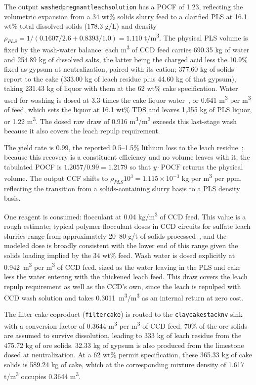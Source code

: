 \documentclass{article}
\renewcommand\_{\textunderscore\allowbreak}
\begin{document}
The output \texttt{washed\_pregnant\_leach\_solution} has a POCF of 1.23, reflecting the volumetric expansion from a 34 wt\% solids slurry feed to a clarified PLS at 16.1 wt\% total dissolved solids (178.3 g/L) and density $\rho_{PLS}=1/(0.1607/2.6+0.8393/1.0)=1.110$ \si{t/m^3}. The physical PLS volume is fixed by the wash-water balance: each \si{m^3} of CCD feed carries 690.35 kg of water and 254.89 kg of dissolved salts, the latter being the charged acid less the 10.9\% fixed as gypsum at neutralization, paired with its cation; 377.60 kg of solids report to the cake (333.00 kg of leach residue plus 44.60 kg of that gypsum), taking 231.43 kg of liquor with them at the 62 wt\% cake specification. Water used for washing is dosed at 3.3 times the cake liquor water~\citet{steinCalculateCountercurrentWashing1990}, or 0.641 \si{m^3} per \si{m^3} of feed, which sets the liquor at 16.1 wt\% TDS and leaves 1,355 kg of PLS liquor, or 1.22 \si{m^3}. The dosed raw draw of 0.916 \si{m^3/m^3} exceeds this last-stage wash because it also covers
the leach repulp requirement.

The yield rate is 0.99, the reported 0.5--1.5\% lithium loss to the leach residue~\cite{sgscanadaincSK1300Technical2024}; because this recovery is a constituent efficiency and no volume leaves with it, the tabulated POCF is $1.2057/0.99=1.2179$ so that $y \cdot \text{POCF}$ returns the physical volume. The output CCF shifts to $\rho_{PLS}10^3=1.115 \times 10^{-3}$ kg per \si{m^3} per ppm, reflecting the transition from a solids-containing slurry basis to a PLS density basis.

One reagent is consumed: flocculant at 0.04 \si{kg/m^3} of CCD feed. This value is a rough estimate; typical polymer flocculant doses in CCD circuits for sulfate leach slurries range from approximately 20--80 g/t of solids processed~\cite{sgscanadaincSK1300Technical2024}, and the modeled dose is broadly consistent with the lower end of this range given the solids loading implied by the 34 wt\% feed. Wash water is dosed explicitly at 0.942~\si{m^3} per \si{m^3} of CCD feed, sized as the water leaving in the PLS and cake less the water entering with the thickened leach feed. This draw covers the leach repulp requirement as well as the CCD's own, since the leach is repulped with CCD wash solution and takes 0.3011~\si{m^3/m^3} as an internal return at zero cost.

The filter cake coproduct (\texttt{filter\_cake}) is routed to the \texttt{claycake\_stack\_nv\_62} sink with a conversion factor of 0.3644 \si{m^3} per \si{m^3} of CCD feed. 70\% of the ore solids are assumed to survive dissolution, leading to 333 kg of leach residue from the 475.72 kg of ore solids. 32.33 kg of gypsum is also produced from the limestone dosed at neutralization. At a 62 wt\% permit specification, these 365.33 kg of cake solids is 589.24 kg of cake, which at the corresponding mixture density of 1.617 \si{t/m^3} occupies 0.3644 \si{m^3}.
\end{document}
